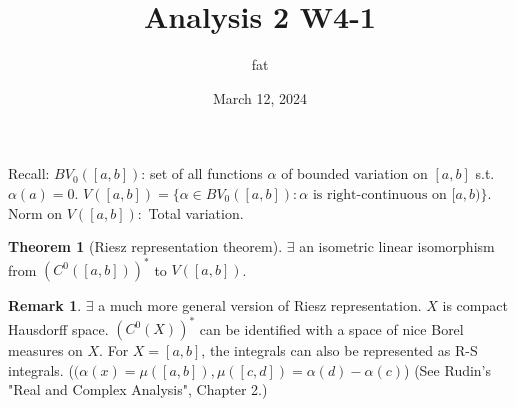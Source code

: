 \documentclass{article}
\title{Analysis 2 W4-1}
\author{fat}
\date{March 12, 2024}
\theoremstyle{definition}
\newtheorem{thm}{Theorem}
\newtheorem{rem}{Remark}
\begin{document}
\maketitle
\thispagestyle{fancy}
\renewcommand{\footrulewidth}{0.4pt}
\cfoot{\thepage}
\renewcommand{\headrulewidth}{0.4pt}

\par Recall:
$BV_0([a, b])$: set of all functions $\alpha$ of bounded variation on $[a, b]$ s.t. $\alpha(a) = 0$.
$V([a, b]) = \{\alpha \in BV_0([a, b]): \alpha \text{ is right-continuous on } [a, b)\}$.
Norm on $V([a, b]):$ Total variation.
\begin{thm}[Riesz representation theorem]
	$\exists$ an isometric linear isomorphism from $(C^0([a, b]))^*$ to $V([a, b])$.
\end{thm}		

\begin{rem}
	$\exists$ a much more general version of Riesz representation.
	$X$ is compact Hausdorff space.
	$(C^0(X))^*$ can be identified with a space of nice Borel measures on $X$.
	For $X = [a, b]$, the integrals can also be represented as R-S integrals.
	($(\alpha(x) = \mu([a, b]), \mu([c, d]) = \alpha(d) - \alpha(c)$)
	(See Rudin's "Real and Complex Analysis", Chapter 2.)
\end{rem}
\end{document}
